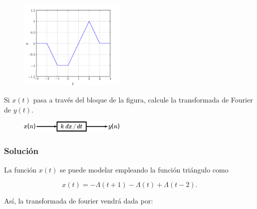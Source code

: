 \documentclass[a4paper,12pt,final]{article}
\begin{document}
      \begin{figure}[H]
        \begin{center}
          \includegraphics[width=0.45\textwidth]{./laboratorio_4/problema02_x.png}
        \end{center}
      \end{figure}

    \noindent Si $x\left(t\right)$ pasa a través del bloque de la figura,
      calcule la transformada de Fourier de $y\left(t\right)$.

      \begin{figure}[H]
        \begin{center}
          \includegraphics[width=0.45\textwidth]{./laboratorio_4/problema02_diagram.png}
        \end{center}
      \end{figure}\vspace{-1.5em}

    \subsubsection*{Solución}

      \noindent La función $x\left(t\right)$ se puede modelar empleando la función triángulo como

        \begin{equation*}
         x\left(t\right) = - \Lambda\left(t + 1\right)
                           - \Lambda\left(t \right)
                           + \Lambda\left(t - 2\right).
        \end{equation*}

      \noindent Así, la transformada de fourier vendrá dada por:
\end{document}
